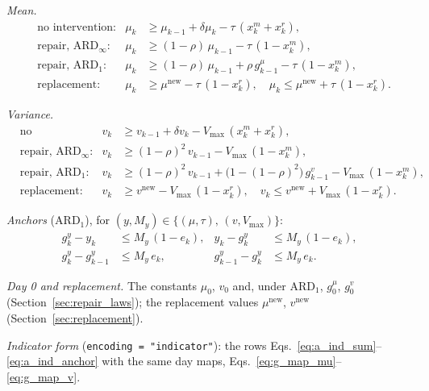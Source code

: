 \documentclass[11pt,a4paper]{article}
\theoremstyle{plain}
\theoremstyle{definition}
\newcommand{\ARDinf}{\mathrm{ARD}_{\infty}}
\newcommand{\ARDone}{\mathrm{ARD}_{1}}
\newcommand{\new}{\mathrm{new}}
\renewcommand{\_}{\textunderscore\allowbreak{}}
\begin{document}
\emph{Mean.}
\begin{align}
  &\text{no intervention:} & \mu_k &\geq \mu_{k-1} + \delta\mu_k - \tau\,(x^m_k + x^r_k),
    \label{eq:g_mu_carry} \\
  &\text{repair, } \ARDinf\text{:} & \mu_k &\geq (1-\rho)\,\mu_{k-1} - \tau\,(1 - x^m_k),
    \label{eq:g_mu_inf} \\
  &\text{repair, } \ARDone\text{:} & \mu_k &\geq (1-\rho)\,\mu_{k-1} + \rho\, g^{\mu}_{k-1}
    - \tau\,(1 - x^m_k),
    \label{eq:g_mu_one} \\
  &\text{replacement:} & \mu_k &\geq \mu^{\new} - \tau\,(1 - x^r_k), \quad
    \mu_k \leq \mu^{\new} + \tau\,(1 - x^r_k).
    \label{eq:g_mu_repl}
\end{align}

\emph{Variance.}
\begin{align}
  &\text{no intervention:} & v_k &\geq v_{k-1} + \delta v_k - V_{\max}\,(x^m_k + x^r_k),
    \label{eq:g_v_carry} \\
  &\text{repair, } \ARDinf\text{:} & v_k &\geq (1-\rho)^2\, v_{k-1}
    - V_{\max}\,(1 - x^m_k),
    \label{eq:g_v_inf} \\
  &\text{repair, } \ARDone\text{:} & v_k &\geq (1-\rho)^2\, v_{k-1}
    + \bigl(1 - (1-\rho)^2\bigr)\, g^{v}_{k-1} - V_{\max}\,(1 - x^m_k),
    \label{eq:g_v_one} \\
  &\text{replacement:} & v_k &\geq v^{\new} - V_{\max}\,(1 - x^r_k), \quad
    v_k \leq v^{\new} + V_{\max}\,(1 - x^r_k).
    \label{eq:g_v_repl}
\end{align}

\emph{Anchors} ($\ARDone$), for $(y, M_y) \in \{(\mu, \tau),\, (v, V_{\max})\}$:
\begin{align}
  g^{y}_k - y_k &\leq M_y\,(1 - e_k), & y_k - g^{y}_k &\leq M_y\,(1 - e_k),
    \label{eq:g_anchor_set} \\
  g^{y}_k - g^{y}_{k-1} &\leq M_y\, e_k, & g^{y}_{k-1} - g^{y}_k &\leq M_y\, e_k.
    \label{eq:g_anchor_keep}
\end{align}

\emph{Day 0 and replacement.} The constants $\mu_0$, $v_0$ and, under $\ARDone$,
$g^{\mu}_0$, $g^{v}_0$ (Section~\ref{sec:repair_laws}); the replacement values
$\mu^{\new}$, $v^{\new}$ (Section~\ref{sec:replacement}).

\emph{Indicator form} (\texttt{encoding = "indicator"}): the rows
Eqs.~\eqref{eq:a_ind_sum}--\eqref{eq:a_ind_anchor} with the same day maps,
Eqs.~\eqref{eq:g_map_mu}--\eqref{eq:g_map_v}.
\end{document}
